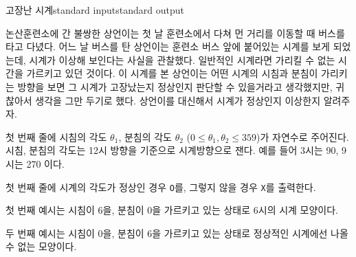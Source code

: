 \begin{problem}{고장난 시계}{standard input}{standard output}

논산훈련소에 간 불쌍한 상언이는 첫 날 훈련소에서 다쳐 먼 거리를 이동할 때 버스를 타고 다녔다. 어느 날 버스를 탄 상언이는 훈련소 버스 앞에 붙어있는 시계를 보게 되었는데, 시계가 이상해 보인다는 사실을 관찰했다. 일반적인 시계라면 가리킬 수 없는 시간을 가르키고 있던 것이다. 이 시계를 본 상언이는 어떤 시계의 시침과 분침이 가리키는 방향을 보면 그 시계가 고장났는지 정상인지 판단할 수 있을거라고 생각했지만, 귀찮아서 생각을 그만 두기로 했다. 상언이를 대신해서 시계가 정상인지 이상한지 알려주자.


\InputFile
첫 번째 줄에 시침의 각도 $\theta_1$, 분침의 각도 $\theta_2$ ($0 \le \theta_1, \theta_2 \le 359$)가 자연수로 주어진다.
시침, 분침의 각도는 12시 방향을 기준으로 시계방향으로 잰다. 예를 들어 3시는 90, 9시는 270 이다.

\OutputFile
첫 번째 줄에 시계의 각도가 정상인 경우 \texttt{O}를, 그렇지 않을 경우 \texttt{X}를 출력한다.

\Example

\begin{example}
%
%
\end{example}

\Notes
첫 번째 예시는 시침이 6을, 분침이 0을 가르키고 있는 상태로 6시의 시계 모양이다.

두 번째 예시는 시침이 0을, 분침이 6을 가르키고 있는 상태로 정상적인 시계에선 나올 수 없는 모양이다.

\end{problem}
